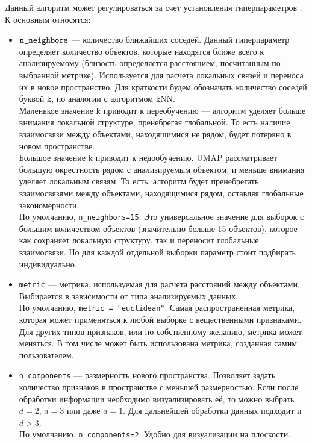 Данный алгоритм может регулироваться за счет установления гиперпараметров \cite{umap}. К основным относятся:
\begin{itemize}
	\item $\verb|n_neighbors|$ --- количество ближайших соседей. Данный гиперпараметр определяет количество объектов, которые находятся ближе всего к анализируемому (близость определяется расстоянием, посчитанным по выбранной метрике). Используется для расчета локальных связей и переноса их в новое пространство. Для краткости будем обозначать количество соседей буквой k, по аналогии с алгоритмом kNN.\\[1mm]
	Маленькое значение k приводит к переобучению --- алгоритм уделяет больше внимания локальной структуре, пренебрегая глобальной. То есть наличие взаимосвязи между объектами, находящимися не рядом, будет потеряно в новом пространстве.\\[1mm]	
	Большое значение k приводит к недообучению. UMAP рассматривает большую окрестность рядом с анализируемым объектом, и меньше внимания уделяет локальным связям. То есть, алгоритм будет пренебрегать взаимосвязями между объектами, находящимися рядом, оставляя глобальные закономерности.\\[1mm]	
	По умолчанию, \verb|n_neighbors=15|. Это универсальное значение для выборок с большим количеством объектов (значительно больше 15 объектов), которое как сохраняет локальную структуру, так и переносит глобальные взаимосвязи. Но для каждой отдельной выборки параметр стоит подбирать индивидуально.
	
	\item \verb|metric| --- метрика, используемая для расчета расстояний между объектами. Выбирается в зависимости от типа анализируемых данных.\\[1mm]	
	По умолчанию, \verb|metric = "euclidean"|. Самая распространенная метрика, которая может применяться к любой выборке с вещественными признаками. Для других типов признаков, или по собственному желанию, метрика может меняться. В том числе может быть использована метрика, созданная самим пользователем.
	
	\item \verb|n_components| --- размерность нового пространства. Позволяет задать количество признаков в пространстве с меньшей размерностью. Если после обработки информации необходимо визуализировать её, то можно выбрать $d=2$, $d=3$ или даже $d=1$. Для дальнейшей обработки данных подходит и $d>3$.\\[1mm]	
	По умолчанию, \verb|n_components=2|. Удобно для визуализации на плоскости.
	

\end{itemize}
